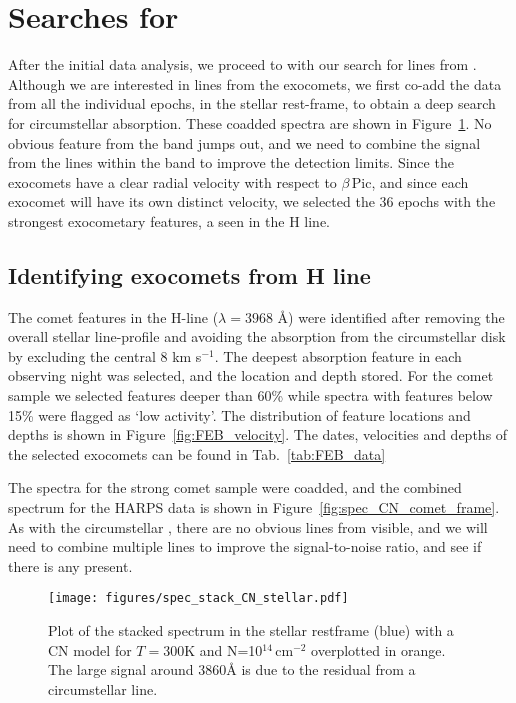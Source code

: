 \documentclass{aa}
\newcommand{\kms}{km s$^{-1}$}
\newcommand{\bp}{$\beta$\,Pic}
\begin{document}
\section{Searches for \texorpdfstring{}{CN}}\label{sect:CNsearch}

After the initial data analysis, we proceed to with our search for lines from .
%
Although we are interested in lines from the exocomets, we first co-add the data from all the individual epochs, in the stellar rest-frame, to obtain a deep search for circumstellar  absorption.
%
These coadded spectra %
are shown in Figure~\ref{fig:spec_CN_stellar_frame}.
%
No obvious feature from the  band jumps out, and we need to combine the signal from the lines within the  band to improve the detection limits.
%
Since the exocomets have a clear radial velocity with respect to \bp{}, and since each exocomet will have its own distinct velocity, we selected the 36 epochs with the strongest exocometary features, a seen in the  H line. 

\subsection{Identifying exocomets from \texorpdfstring{}{CaII} H line}\label{sect:FEBid}

The comet features in the  H-line ($\lambda=3968$ \AA) were identified after removing the overall stellar line-profile and avoiding the absorption from the circumstellar disk by excluding the central 8 \kms{}.
%
The deepest absorption feature in each observing night was selected, and the location and depth stored.
%
For the comet sample we selected features deeper than 60\% %
while spectra with features below 15\% %
were flagged as `low activity'.
%
The distribution of feature locations and depths is shown in Figure~\ref{fig:FEB_velocity}. The dates, velocities and depths of the selected exocomets can be found in Tab.~\ref{tab:FEB_data}

The spectra for the strong comet sample were coadded, and the combined spectrum for the HARPS data is shown in Figure~\ref{fig:spec_CN_comet_frame}.
%
As with the circumstellar , there are no obvious lines from  visible, and we will need to combine multiple lines to improve the signal-to-noise ratio, and see if there is any  present. 

\begin{figure}
    \begin{centering}
        \texttt{[image: figures/spec\_stack\_CN\_stellar.pdf]}
        \caption{Plot of the stacked spectrum in the stellar restframe (blue) with a CN model for $T=$300K and N=10$^{14}$\,cm$^{-2}$ overplotted in orange.
        The large signal around 3860\AA{} is due to the residual from a circumstellar  line.}
        \label{fig:spec_CN_stellar_frame}
    \end{centering}
\end{figure}
\end{document}
